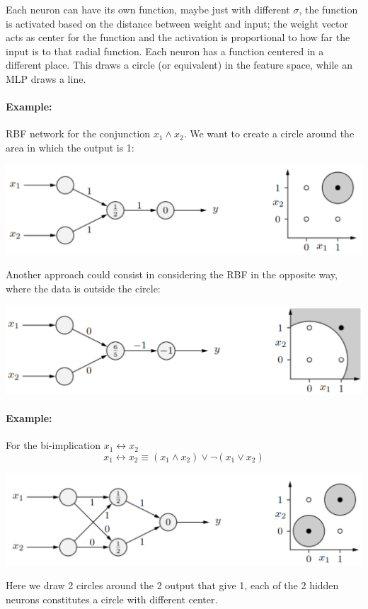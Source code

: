 \documentclass[11pt]{article}
\begin{document}
		Each neuron can have its own function, maybe just with different $\sigma$, the function is activated based on the distance between weight and input; the weight vector acts as center for the function and the activation is proportional to how far the input is to that radial function. Each neuron has a function centered in a different place. This draws a circle (or equivalent) in the feature space, while an MLP draws a line.\\
		
		\paragraph{Example:} RBF network for the conjunction $x_1 \wedge x_2$. We want to create a circle around the area in which the output is 1:
		\begin{center}
			\includegraphics[width=0.8\columnwidth]{img/NN/RBF1}
		\end{center}
		Another approach could consist in considering the RBF in the opposite way, where the data is outside the circle:
		\begin{center}
			\includegraphics[width=0.8\columnwidth]{img/NN/RBF2}
		\end{center}
		
		\newpage
		
		\paragraph{Example:} For the bi-implication $x_1 \leftrightarrow x_2$
		$$ x_1 \leftrightarrow x_2 \equiv (x_1 \wedge x_2) \vee \neg (x_1 \vee x_2) $$
		\begin{center}
			\includegraphics[width=0.75\columnwidth]{img/NN/RBF3}
		\end{center}
		Here we draw 2 circles around the 2 output that give 1, each of the 2 hidden neurons constitutes a circle with different center.\\
		
\end{document}
